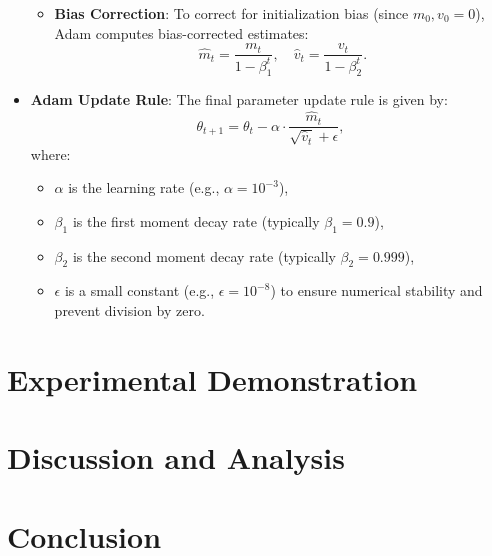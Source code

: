 \documentclass[12pt,a4paper]{article}
\theoremstyle{definition}
\begin{document}
\begin{itemize}
\begin{itemize}
        \item \textbf{Bias Correction}: To correct for initialization bias (since $m_0, v_0 = 0$), Adam computes bias-corrected estimates:
        \[
        \hat{m}_t = \frac{m_t}{1 - \beta_1^t}, \quad \hat{v}_t = \frac{v_t}{1 - \beta_2^t}.
        \]
    \end{itemize}

    \item \textbf{Adam Update Rule}: The final parameter update rule is given by:
    \[
    \theta_{t+1} = \theta_t - \alpha \cdot \frac{\hat{m}_t}{\sqrt{\hat{v}_t} + \epsilon},
    \]
    where:
    \begin{itemize}
        \item $\alpha$ is the learning rate (e.g., $\alpha = 10^{-3}$),
        \item $\beta_1$ is the first moment decay rate (typically $\beta_1 = 0.9$),
        \item $\beta_2$ is the second moment decay rate (typically $\beta_2 = 0.999$),
        \item $\epsilon$ is a small constant (e.g., $\epsilon = 10^{-8}$) to ensure numerical stability and prevent division by zero.
    \end{itemize}

\end{itemize}







\section{Experimental Demonstration}

\section{Discussion and Analysis}

\section{Conclusion}
\end{document}
